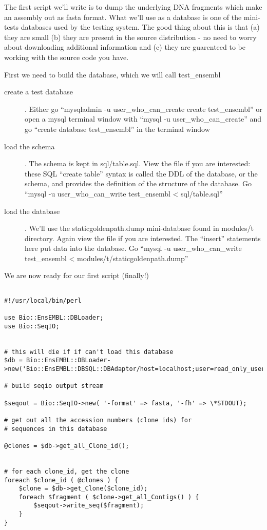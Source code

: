 \documentclass[11pt,a4paper]{article}
\begin{document}
The first script we'll write is to dump the underlying DNA fragments
which make an assembly out as fasta format. What we'll use as a
database is one of the mini-tests databases used by the testing
system. The good thing about this is that (a) they are small (b) they
are present in the source distribution - no need to worry about
downloading additional information and (c) they are guarenteed to be
working with the source code you have.

First we need to build the database, which we will call test\_ensembl

\begin{description}
\item[create a test database]. Either go ``mysqladmin -u user\_who\_can\_create create test\_ensembl'' or open
a mysql terminal window with ``mysql -u user\_who\_can\_create'' and go ``create database test\_ensembl''
in the terminal window
\item[load the schema]. The schema is kept in sql/table.sql. View the file if you are interested:
these SQL ``create table'' syntax is called the DDL of the database, or the schema, and provides the 
definition of the structure of the database. Go ``mysql -u user\_who\_can\_write test\_ensembl < sql/table.sql''
\item[load the database]. We'll use the staticgoldenpath.dump mini-database found in modules/t directory.
Again view the file if you are interested. The ``insert'' statements here put data into the database. Go
``mysql -u user\_who\_can\_write test\_ensembl < modules/t/staticgoldenpath.dump''
\end{description}

We are now ready for our first script (finally!)

\begin{verbatim}

#!/usr/local/bin/perl

use Bio::EnsEMBL::DBLoader;
use Bio::SeqIO;


# this will die if if can't load this database
$db = Bio::EnsEMBL::DBLoader->new('Bio::EnsEMBL::DBSQL::DBAdaptor/host=localhost;user=read_only_user;dbname=test_ensembl');

# build seqio output stream

$seqout = Bio::SeqIO->new( '-format' => fasta, '-fh' => \*STDOUT);

# get out all the accession numbers (clone ids) for
# sequences in this database

@clones = $db->get_all_Clone_id();


# for each clone_id, get the clone
foreach $clone_id ( @clones ) {
	$clone = $db->get_Clone($clone_id);
	foreach $fragment ( $clone->get_all_Contigs() ) {
		$seqout->write_seq($fragment);
   	}
}

\end{verbatim}
\end{document}
